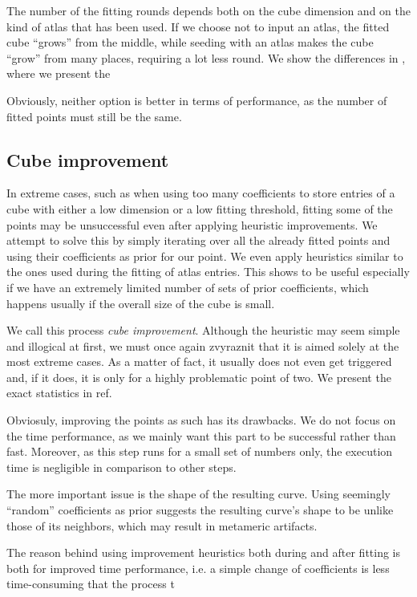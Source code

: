 The number of the fitting rounds depends both on the cube dimension and on the kind of atlas that has been used. If we choose not to input an atlas, the fitted cube ``grows'' from the middle, while seeding with an atlas makes the cube ``grow'' from many places, requiring a lot less round. We show the differences in , where we present the 

Obviously, neither option is better in terms of performance, as the number of fitted points must still be the same. 

\subsection{Cube improvement} \label{ssec:cubeImprovement}

In extreme cases, such as when using too many coefficients to store entries of a cube with either a low dimension or a low fitting threshold, fitting some of the points may be unsuccessful even after applying heuristic improvements. We attempt to solve this by simply iterating over all the already fitted points and using their coefficients as prior for our point. We even apply heuristics similar to the ones used during the fitting of atlas entries. This shows to be useful especially if we have an extremely limited number of sets of prior coefficients, which happens usually if the overall size of the cube is small.

We call this process \emph{cube improvement}. Although the heuristic may seem simple and illogical at first, we must once again zvyraznit that it is aimed solely at the most extreme cases. As a matter of fact, it usually does not even get triggered and, if it does, it is only for a highly problematic point of two. We present the exact statistics in ref.

Obviosuly, improving the points as such has its drawbacks. We do not focus on the time performance, as we mainly want this part to be successful rather than fast. Moreover, as this step runs for a small set of numbers only, the execution time is negligible in comparison to other steps.

The more important issue is the shape of the resulting curve. Using seemingly ``random'' coefficients as prior suggests the resulting curve's shape to be unlike those of its neighbors, which may result in metameric artifacts.


The reason behind using improvement heuristics both during and after fitting is both for improved time performance, i.e. a simple change of coefficients is less time-consuming that the process t

